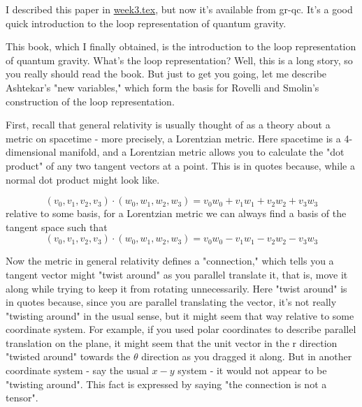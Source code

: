 
I described this paper in {\hyperref[week3]{week3.tex}}, but now it's available from gr-qc. It's a good quick introduction to the loop representation of quantum gravity.


This book, which I finally obtained, is the introduction to the loop representation of quantum gravity. What's the loop representation? Well, this is a long story, so you really should read the book. But just to get you going, let me describe Ashtekar's "new variables," which form the basis for Rovelli and Smolin's construction of the loop representation.

First, recall that general relativity is usually thought of as a theory about a metric on spacetime - more precisely, a Lorentzian metric. Here spacetime is a 4-dimensional manifold, and a Lorentzian metric allows you to calculate the "dot product" of any two tangent vectors at a point. This is in quotes because, while a normal dot product might look like.

\[(v_0,v_1,v_2,v_3) \cdot (w_0,w_1,w_2,w_3) =  v_0w_0 + v_1w_1 + v_2w_2 + v_3w_3\]
relative to some basis, for a Lorentzian metric we can always find a basis of the tangent space such that
\[(v_0,v_1,v_2,v_3)\cdot (w_0,w_1,w_2,w_3) = v_0w_0 - v_1w_1 - v_2w_2 - v_3w_3\]

Now the metric in general relativity defines a "connection," which tells you a tangent vector might "twist around" as you parallel translate it, that is, move it along while trying to keep it from rotating unnecessarily. Here "twist around" is in quotes because, since you are parallel translating the vector, it's not really "twisting around" in the usual sense, but it might seem that way relative to some coordinate system. For example, if you used polar coordinates to describe parallel translation on the plane, it might seem that the unit vector in the r direction "twisted around" towards the $\theta$ direction as you dragged it along. But in another coordinate system - say the usual $x-y$ system - it would not appear to be "twisting around". This fact is expressed by saying "the connection is not a tensor".

